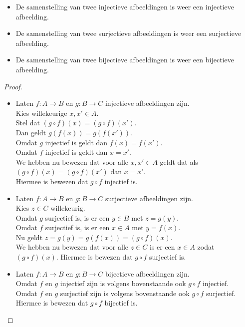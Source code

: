 \begin{theorem}\mbox{}
\begin{itemize}
    \item De samenstelling van twee injectieve afbeeldingen is weer een injectieve afbeelding.
    \item De samenstelling van twee surjectieve afbeeldingen is weer een surjectieve afbeelding.
    \item De samenstelling van twee bijectieve afbeeldingen is weer een bijectieve afbeelding.
\end{itemize}\label{st:compositie}
\end{theorem}
\begin{proof}\mbox{}\\
\begin{itemize}
    \item Laten $f:A\rightarrow B$ en $g:B\rightarrow C$ injectieve afbeeldingen zijn.\\[1.5pt] 
    Kies willekeurige $x, x'\in A$.\\[1.5pt]
    Stel dat $(g\circ f)(x)=(g\circ f)(x')$.\\[1.5pt]
    Dan geldt $g(f(x)) = g(f(x'))$.\\[1.5pt]
    Omdat $g$ injectief is geldt dan $f(x)=f(x')$.\\[1.5pt]
    Omdat $f$ injectief is geldt dan $x=x'$.\\[1.5pt]
    We hebben nu bewezen dat voor alle $x,x'\in A$ geldt dat als $(g\circ f)(x)=(g\circ f)(x')$ dan $x=x'$.\\[1.5pt]
    Hiermee is bewezen dat $g\circ f$ injectief is.
    \item Laten $f:A\rightarrow B$ en $g:B\rightarrow C$ surjectieve afbeeldingen zijn.\\[1.5pt]
    Kies $z\in C$ willekeurig.\\[1.5pt]
    Omdat $g$ surjectief is, is er een $y\in B$ met $z=g(y)$.\\[1.5pt]
    Omdat $f$ surjectief is, is er een $x\in A$ met $y = f(x)$.\\[1.5pt]
    Nu geldt $z=g(y)=g(f(x))=(g\circ f)(x)$.\\[1.5pt]
    We hebben nu bewezen dat voor alle $z\in C$ is er een $x\in A$ zodat $(g\circ f)(x)$.
    Hiermee is bewezen dat $g\circ f$ surjectief is.
    \item Laten $f:A\rightarrow B$ en $g:B\rightarrow C$ bijectieve afbeeldingen zijn.\\[1.5pt]
    Omdat $f$ en $g$ injectief zijn is volgens bovenstaande ook $g\circ f$ injectief.\\[1.5pt]
    Omdat $f$ en $g$ surjectief zijn is volgens bovenstaande ook $g\circ f$ surjectief.\\[1.5pt]
    Hiermee is bewezen dat $g\circ f$ bijectief is.
\end{itemize}
\end{proof}


